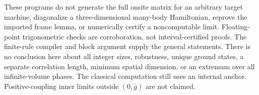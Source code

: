 These programs do not generate the full onsite matrix for an
arbitrary target machine, diagonalize a three-dimensional many-body
Hamiltonian, reprove the imported frame lemma, or numerically certify
a noncomputable limit. Floating-point trigonometric checks are
corroboration, not interval-certified proofs. The finite-rule
compiler and block argument supply the general statements.
There is no conclusion here about all integer sizes, robustness,
unique ground states, a separate correlation length, minimum spatial
dimension, or an extremum over all infinite-volume phases. The
classical computation still uses an internal anchor. Positive-coupling
inner limits outside $(0,\bar g)$ are not claimed.
